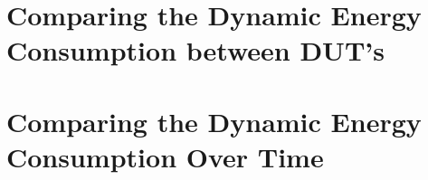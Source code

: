 \section{Comparing the Dynamic Energy Consumption between DUT's}\label{app:comparison}





\section{Comparing the Dynamic Energy Consumption Over Time}\label{app:iterations}




























